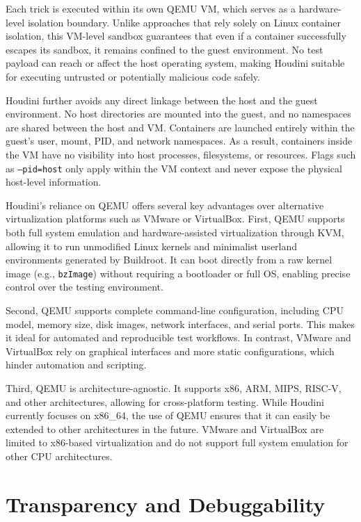 \documentclass[12pt]{report}
\begin{document}
\begin{doublespace}
Each trick is executed within its own QEMU VM, which serves as a hardware-level isolation boundary. Unlike approaches that rely solely on Linux container isolation, this VM-level sandbox guarantees that even if a container successfully escapes its sandbox, it remains confined to the guest environment. No test payload can reach or affect the host operating system, making Houdini suitable for executing untrusted or potentially malicious code safely.

Houdini further avoids any direct linkage between the host and the guest environment. No host directories are mounted into the guest, and no namespaces are shared between the host and VM. Containers are launched entirely within the guest’s user, mount, PID, and network namespaces. As a result, containers inside the VM have no visibility into host processes, filesystems, or resources. Flags such as \texttt{--pid=host} only apply within the VM context and never expose the physical host-level information.

Houdini’s reliance on QEMU offers several key advantages over alternative virtualization platforms such as VMware or VirtualBox. First, QEMU supports both full system emulation and hardware-assisted virtualization through KVM, allowing it to run unmodified Linux kernels and minimalist userland environments generated by Buildroot. It can boot directly from a raw kernel image (e.g., \texttt{bzImage}) without requiring a bootloader or full OS, enabling precise control over the testing environment.

Second, QEMU supports complete command-line configuration, including CPU model, memory size, disk images, network interfaces, and serial ports. This makes it ideal for automated and reproducible test workflows. In contrast, VMware and VirtualBox rely on graphical interfaces and more static configurations, which hinder automation and scripting.

Third, QEMU is architecture-agnostic. It supports x86, ARM, MIPS, RISC-V, and other architectures, allowing for cross-platform testing. While Houdini currently focuses on x86\_64, the use of QEMU ensures that it can easily be extended to other architectures in the future. VMware and VirtualBox are limited to x86-based virtualization and do not support full system emulation for other CPU architectures.


\section{Transparency and Debuggability}


\end{doublespace}
\end{document}
